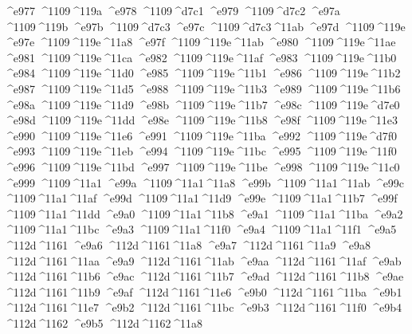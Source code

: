 \checkit ^^^^e977 ^^^^1109^^^^119a
\checkit ^^^^e978 ^^^^1109^^^^d7c1
\checkit ^^^^e979 ^^^^1109^^^^d7c2
\checkit ^^^^e97a ^^^^1109^^^^119b
\checkit ^^^^e97b ^^^^1109^^^^d7c3
\checkit ^^^^e97c ^^^^1109^^^^d7c3^^^^11ab
\checkit ^^^^e97d ^^^^1109^^^^119e
\checkit ^^^^e97e ^^^^1109^^^^119e^^^^11a8
\checkit ^^^^e97f ^^^^1109^^^^119e^^^^11ab
\checkit ^^^^e980 ^^^^1109^^^^119e^^^^11ae
\checkit ^^^^e981 ^^^^1109^^^^119e^^^^11ca
\checkit ^^^^e982 ^^^^1109^^^^119e^^^^11af
\checkit ^^^^e983 ^^^^1109^^^^119e^^^^11b0
\checkit ^^^^e984 ^^^^1109^^^^119e^^^^11d0
\checkit ^^^^e985 ^^^^1109^^^^119e^^^^11b1
\checkit ^^^^e986 ^^^^1109^^^^119e^^^^11b2
\checkit ^^^^e987 ^^^^1109^^^^119e^^^^11d5
\checkit ^^^^e988 ^^^^1109^^^^119e^^^^11b3
\checkit ^^^^e989 ^^^^1109^^^^119e^^^^11b6
\checkit ^^^^e98a ^^^^1109^^^^119e^^^^11d9
\checkit ^^^^e98b ^^^^1109^^^^119e^^^^11b7
\checkit ^^^^e98c ^^^^1109^^^^119e^^^^d7e0
\checkit ^^^^e98d ^^^^1109^^^^119e^^^^11dd
\checkit ^^^^e98e ^^^^1109^^^^119e^^^^11b8
\checkit ^^^^e98f ^^^^1109^^^^119e^^^^11e3
\checkit ^^^^e990 ^^^^1109^^^^119e^^^^11e6
\checkit ^^^^e991 ^^^^1109^^^^119e^^^^11ba
\checkit ^^^^e992 ^^^^1109^^^^119e^^^^d7f0
\checkit ^^^^e993 ^^^^1109^^^^119e^^^^11eb
\checkit ^^^^e994 ^^^^1109^^^^119e^^^^11bc
\checkit ^^^^e995 ^^^^1109^^^^119e^^^^11f0
\checkit ^^^^e996 ^^^^1109^^^^119e^^^^11bd
\checkit ^^^^e997 ^^^^1109^^^^119e^^^^11be
\checkit ^^^^e998 ^^^^1109^^^^119e^^^^11c0
\checkit ^^^^e999 ^^^^1109^^^^11a1
\checkit ^^^^e99a ^^^^1109^^^^11a1^^^^11a8
\checkit ^^^^e99b ^^^^1109^^^^11a1^^^^11ab
\checkit ^^^^e99c ^^^^1109^^^^11a1^^^^11af
\checkit ^^^^e99d ^^^^1109^^^^11a1^^^^11d9
\checkit ^^^^e99e ^^^^1109^^^^11a1^^^^11b7
\checkit ^^^^e99f ^^^^1109^^^^11a1^^^^11dd
\checkit ^^^^e9a0 ^^^^1109^^^^11a1^^^^11b8
\checkit ^^^^e9a1 ^^^^1109^^^^11a1^^^^11ba
\checkit ^^^^e9a2 ^^^^1109^^^^11a1^^^^11bc
\checkit ^^^^e9a3 ^^^^1109^^^^11a1^^^^11f0
\checkit ^^^^e9a4 ^^^^1109^^^^11a1^^^^11f1
\checkit ^^^^e9a5 ^^^^112d^^^^1161
\checkit ^^^^e9a6 ^^^^112d^^^^1161^^^^11a8
\checkit ^^^^e9a7 ^^^^112d^^^^1161^^^^11a9
\checkit ^^^^e9a8 ^^^^112d^^^^1161^^^^11aa
\checkit ^^^^e9a9 ^^^^112d^^^^1161^^^^11ab
\checkit ^^^^e9aa ^^^^112d^^^^1161^^^^11af
\checkit ^^^^e9ab ^^^^112d^^^^1161^^^^11b6
\checkit ^^^^e9ac ^^^^112d^^^^1161^^^^11b7
\checkit ^^^^e9ad ^^^^112d^^^^1161^^^^11b8
\checkit ^^^^e9ae ^^^^112d^^^^1161^^^^11b9
\checkit ^^^^e9af ^^^^112d^^^^1161^^^^11e6
\checkit ^^^^e9b0 ^^^^112d^^^^1161^^^^11ba
\checkit ^^^^e9b1 ^^^^112d^^^^1161^^^^11e7
\checkit ^^^^e9b2 ^^^^112d^^^^1161^^^^11bc
\checkit ^^^^e9b3 ^^^^112d^^^^1161^^^^11f0
\checkit ^^^^e9b4 ^^^^112d^^^^1162
\checkit ^^^^e9b5 ^^^^112d^^^^1162^^^^11a8
